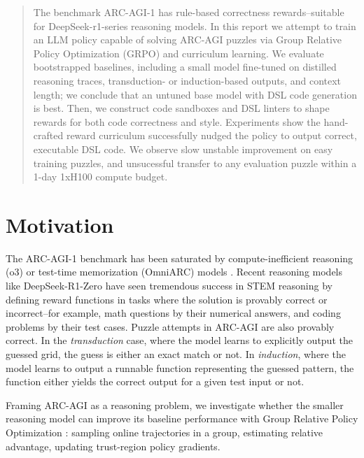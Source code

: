 \documentclass{article}
\begin{document}

\printAffiliationsAndNotice{}

\begin{abstract}
  The benchmark ARC-AGI-1 has rule-based correctness rewards--suitable for DeepSeek-r1-series reasoning models. In this report we attempt to train an LLM policy capable of solving ARC-AGI puzzles via Group Relative Policy Optimization (GRPO) and curriculum learning. We evaluate bootstrapped baselines, including a small model fine-tuned on distilled reasoning traces, transduction- or induction-based outputs, and context length; we conclude that an untuned base model with DSL code generation is best. Then, we construct code sandboxes and DSL linters to shape rewards for both code correctness and style. Experiments show the hand-crafted reward curriculum successfully nudged the policy to output correct, executable DSL code. We observe slow unstable improvement on easy training puzzles, and unsucessful transfer to any evaluation puzzle within a 1-day 1xH100 compute budget.
\end{abstract}

\section{Motivation}
The ARC-AGI-1 \cite{ARC-AGI} benchmark has been saturated by compute-inefficient reasoning (o3) or test-time memorization (OmniARC) models \cite{openai_openai_nodate} \cite{OmniARC}. Recent reasoning models like DeepSeek-R1-Zero  have seen tremendous success in STEM reasoning by defining reward functions in tasks where the solution is provably correct or incorrect--for example, math questions by their numerical answers, and coding problems by their test cases. Puzzle attempts in ARC-AGI are also provably correct. In the \textit{transduction} case, where the model learns to explicitly output the guessed grid, the guess is either an exact match or not. In \textit{induction}, where the model learns to output a runnable function representing the guessed pattern, the function either yields the correct output for a given test input or not.

Framing ARC-AGI as a reasoning problem, we investigate whether the smaller reasoning model  can improve its baseline performance with Group Relative Policy Optimization \cite{GRPO}: sampling online trajectories in a group, estimating relative advantage, updating trust-region policy gradients.
\end{document}
